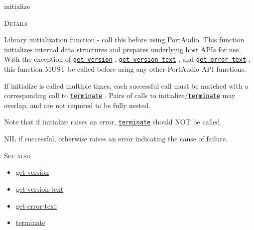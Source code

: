 \documentclass[a4paper]{report}
\begin{document}
    \label{portaudio__fun__initialize}
    \begin{defun}[Function]
    initialize


	
    \bigskip
    \textsc{Details}

Library initialization function - call this before using PortAudio. This function initializes internal data structures and prepares underlying host APIs for use. With the exception of \hyperref[portaudio__fun__get-version]{\texttt{get-version}}
  , \hyperref[portaudio__fun__get-version-text]{\texttt{get-version-text}}
  , and \hyperref[portaudio__fun__get-error-text]{\texttt{get-error-text}}
  , this function MUST be called before using any other PortAudio API functions.

If initialize is called multiple times, each successful call must be matched with a corresponding call to \hyperref[portaudio__fun__terminate]{\texttt{terminate}}
  . Pairs of calls to initialize/\hyperref[portaudio__fun__terminate]{\texttt{terminate}}
   may overlap, and are not required to be fully nested.

Note that if initialize raises an error, \hyperref[portaudio__fun__terminate]{\texttt{terminate}}
   should NOT be called.

NIL if successful, otherwise raises an error indicating the cause of failure.


      
    \bigskip
    \textsc{See also}


	
    \begin{itemize}
    
	  
    \item
    \hyperref[portaudio__fun__get-version]{get-version}
    
    \item
    \hyperref[portaudio__fun__get-version-text]{get-version-text}
    
    \item
    \hyperref[portaudio__fun__get-error-text]{get-error-text}
    
    \item
    \hyperref[portaudio__fun__terminate]{terminate}
    
	
    \end{itemize}
  
      


    
    \end{defun}
  
\end{document}
